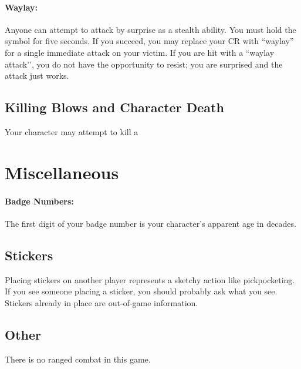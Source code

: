 \documentclass[sheet]{GL2020}
\begin{document}
\paragraph{Waylay:} Anyone can attempt to attack by surprise as a stealth ability. You must hold the symbol for five seconds.  If you succeed, you may replace your CR with ``waylay'' for a single immediate attack on your victim. If you are hit with a ``waylay attack’’, you do not have the opportunity to resist; you are surprised and the attack just works.

\subsection{Killing Blows and Character Death}

Your character may attempt to kill a 

\clearpage
\section{Miscellaneous}

\paragraph{Badge Numbers:} The first digit of your badge number is your character's apparent age in decades.

%
%
%

\clearpage

\subsection{Stickers}
Placing stickers on another player represents a sketchy action like pickpocketing. If you see someone placing a sticker, you should probably ask what you see. Stickers already in place are out-of-game information.

\subsection{Other}

There is no ranged combat in this game.
\end{document}
